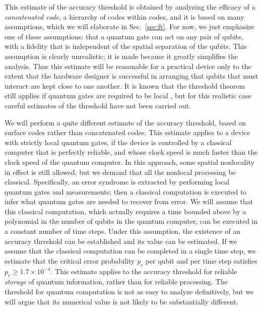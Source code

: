 This estimate of the accuracy threshold is obtained by analyzing the efficacy of a {\em concatenated code}, a hierarchy of codes within codes, and it is based on many assumptions, which we will elaborate in Sec.~\ref{sec:ft}. For now, we just emphasize one of these assumptions: that a quantum gate can act on any pair of qubits, with a fidelity that is independent of the spatial separation of the qubits. This assumption is clearly unrealistic; it is made because it greatly simplifies the analysis. Thus this estimate will be reasonable for a practical device only to the extent that the hardware designer is successful in arranging that qubits that must interact are kept close to one another. It is known that the threshold theorem still applies if quantum gates are required to be local \cite{ben-or,gottesman_local}, but for this realistic case careful estimates of the threshold have not been carried out.

We will perform a quite different estimate of the accuracy threshold, based on surface codes rather than concatenated codes. This estimate applies to a device with strictly local quantum gates, if the device is controlled by a classical computer that is perfectly reliable, and whose clock speed is much faster than the clock speed of the quantum computer. In this approach, some spatial nonlocality in effect is still allowed, but we demand that all the nonlocal processing be classical. Specifically, an error syndrome is extracted by performing local quantum gates and measurements; then a classical computation is executed to infer what quantum gates are needed to recover from error. We will assume that this classical computation, which actually requires a time bounded above by a polynomial in the number of qubits in the quantum computer, can be executed in a constant number of time steps. Under this assumption, the existence of an accuracy threshold can be established and its value can be estimated. If we assume that the classical computation can be completed in a single time step, we estimate that the critical error probability $p_c$  per qubit and per time step satisfies $p_c\ge 1.7\times 10^{-4}$. This estimate applies to the accuracy threshold for reliable {\em storage} of quantum information, rather than for reliable processing. The threshold for quantum computation is not as easy to analyze definitively, but we will argue that its numerical value is not likely to be substantially different.

